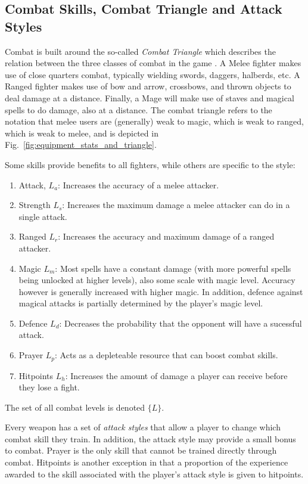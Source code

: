 	\subsection{Combat Skills, Combat Triangle and Attack Styles}
		Combat is built around the so-called \textit{Combat Triangle} which describes the relation between the three classes of combat in the game \cite{wiki:combat_triangle}. A Melee fighter makes use of close quarters combat, typically wielding swords, daggers, halberds, etc. A Ranged fighter makes use of bow and arrow, crossbows, and thrown objects to deal damage at a distance. Finally, a Mage will make use of staves and magical spells to do damage, also at a distance. The combat triangle refers to the notation that melee users are (generally) weak to magic, which is weak to ranged, which is weak to melee, and is depicted in Fig.~\ref{fig:equipment_stats_and_triangle}.

		Some skills provide benefits to all fighters, while others are specific to the style:
		\begin{enumerate}
			\item Attack, $L_a$: Increases the accuracy of a melee attacker.
			\item Strength $L_s$: Increases the maximum damage a melee attacker can do in a single attack.
			\item Ranged $L_r$: Increases the accuracy and maximum damage of a ranged attacker.
			\item Magic $L_m$: Most spells have a constant damage (with more powerful spells being unlocked at higher levels), also some scale with magic level. Accuracy however is generally increased with higher magic. In addition, defence against magical attacks is partially determined by the player's magic level.
			\item Defence $L_d$: Decreases the probability that the opponent will have a sucessful attack.
			\item Prayer $L_p$: Acts as a depleteable resource that can boost combat skills.
			\item Hitpoints $L_h$: Increases the amount of damage a player can receive before they lose a fight.
		\end{enumerate}
		The set of all combat levels is denoted $\{L\}$.

		Every weapon has a set of \textit{attack styles} that allow a player to change which combat skill they train. In addition, the attack style may provide a small bonus to combat. Prayer is the only skill that cannot be trained directly through combat. Hitpoints is another exception in that a proportion of the experience awarded to the skill associated with the player's attack style is given to hitpoints.

